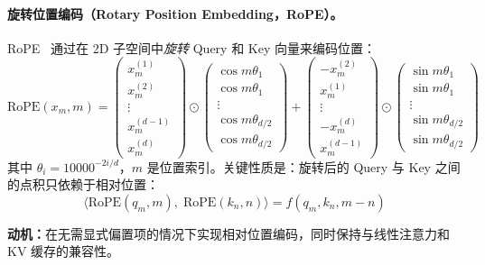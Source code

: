 \paragraph{旋转位置编码（Rotary Position Embedding，RoPE）。}
\label{rotary-position-embedding-rope.}

RoPE~\cite{su2024roformer} 通过在 2D 子空间中\emph{旋转} Query 和 Key 向量来编码位置：
\[
\text{RoPE}(x_m, m) = \begin{pmatrix} x_m^{(1)} \\ x_m^{(2)} \\ \vdots \\ x_m^{(d-1)} \\ x_m^{(d)} \end{pmatrix}
  \odot
  \begin{pmatrix} \cos m\theta_1 \\ \cos m\theta_1 \\ \vdots \\ \cos m\theta_{d/2} \\ \cos m\theta_{d/2} \end{pmatrix}
  +
  \begin{pmatrix} -x_m^{(2)} \\ x_m^{(1)} \\ \vdots \\ -x_m^{(d)} \\ x_m^{(d-1)} \end{pmatrix}
  \odot
  \begin{pmatrix} \sin m\theta_1 \\ \sin m\theta_1 \\ \vdots \\ \sin m\theta_{d/2} \\ \sin m\theta_{d/2} \end{pmatrix}
\]
其中 $\theta_i = 10000^{-2i/d}$，$m$ 是位置索引。关键性质是：旋转后的 Query 与 Key 之间的点积只依赖于相对位置：
\[
\langle \text{RoPE}(q_m, m),\; \text{RoPE}(k_n, n) \rangle = f(q_m, k_n, m-n)
\]

\textbf{动机：}在无需显式偏置项的情况下实现相对位置编码，同时保持与线性注意力和 KV 缓存的兼容性。

